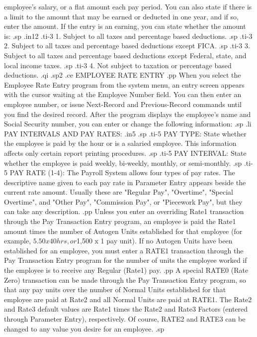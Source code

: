 employee's salary, or a flat amount each pay period.
You can also state if there is a limit to the amount that may be earned or
deducted in one year, and if so, enter the amount.
If the entry is an earning, you can state whether the
amount is:
.sp
.in12
.ti-3
1. Subject to all taxes and percentage based deductions.
.sp
.ti-3
2. Subject to all taxes and percentage based deductions
except FICA.
.sp
.ti-3
3. Subject to all taxes and percentage based deductions
except Federal, state, and local income taxes.
.sp
.ti-3
4. Not subject to taxation or percentage based deductions.
.qi
.sp2
.ce
EMPLOYEE RATE ENTRY
.pp
When you select the Employee Rate Entry program from the system menu,
an entry screen appears with the cursor waiting at
the Employee Number field.  You can then enter an employee number, or
issue Next-Record and Previous-Record commands until you find the
desired record. After the program displays
the employee's name and Social Security number,
you can enter or change the following information:
.sp
.li
PAY INTERVALS AND PAY RATES:
.in5
.sp
.ti-5
PAY TYPE:  State whether the employee is paid
by the hour or is a salaried employee.	This information affects only
certain report printing procedures.
.sp
.ti-5
PAY INTERVAL: State whether the employee is paid weekly, bi-weekly,
monthly, or semi-monthly.
.sp
.ti-5
PAY RATE (1-4): The Payroll System allows four types of pay rates.
The descriptive name given to each pay rate in
Parameter Entry appears beside
the current rate amount.  Usually these are "Regular Pay", "Overtime",
"Special Overtime", and "Other Pay", "Commission Pay", or "Piecework Pay",
but they can take any description.
.pp
Unless you enter an overriding Rate1 transaction through the Pay Transaction
Entry program, an employee is paid the Rate1 amount times the
number of Autogen Units established for that employee
(for example, $5.50 x 40 hrs, or $1,500 x 1 pay unit). If no Autogen Units
have been established for an employee, you must enter a RATE1 transaction
through the Pay Transaction Entry program for the number of units the
employee worked
if the employee is to receive any Regular (Rate1) pay.
.pp
A special RATE0 (Rate Zero) transaction can be made through the Pay
Transaction Entry program, so that
any pay units over the number of Normal Units established for that employee
are paid at Rate2 and all Normal Units are paid at RATE1.
The Rate2 and Rate3 default values
are Rate1 times the Rate2 and Rate3 Factors (entered through
Parameter Entry), respectively.
Of course, RATE2 and
RATE3 can be changed to any value you desire for an employee.
.sp
